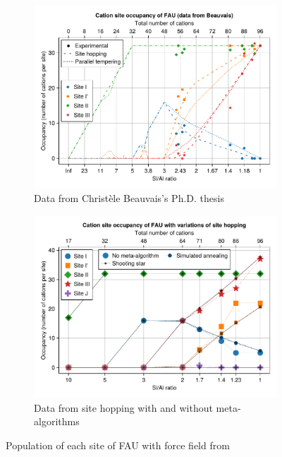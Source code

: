 \documentclass[main.tex]{subfiles}
\begin{document}
\begin{figure}
	\centering
	\begin{subfigure}{0.9\linewidth}
		\centering
		\includegraphics[width=\linewidth]{figures/cations/christele.pdf}
		\caption{Data from Christèle Beauvais's Ph.D. thesis \cite{Beauvais}}\label{fig:christele}
	\end{subfigure}

	\begin{subfigure}{0.9\linewidth}
		\centering
		\includegraphics[width=\linewidth]{figures/cations/FAUJeffroyFF_varationssitehopping.pdf}
		\caption{Data from site hopping with and without meta-algorithms}\label{fig:sitehopping_jeffroyFF}
	\end{subfigure}

	\caption{Population of each site of FAU with force field from \textcite{DiLellaFF}}
\end{figure}
\end{document}
